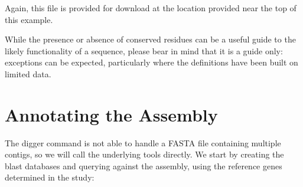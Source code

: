 \documentclass[letterpaper,10pt,english]{sphinxmanual}
\begin{document}
\begin{sphinxVerbatim}[commandchars=\\\{\}]
\end{sphinxVerbatim}

\sphinxAtStartPar
Again, this file is provided for download at the location provided near the top of this example.

\sphinxAtStartPar
While the presence or absence of conserved residues can be a useful guide to the likely functionality of a sequence, please bear in mind that it is a guide only:
exceptions can be expected, particularly where the definitions have been built on limited data.


\section{Annotating the Assembly}
\label{\detokenize{examples/rhesus_igh:annotating-the-assembly}}
\sphinxAtStartPar
The digger command is not able to handle a FASTA file containing multiple contigs, so we will call the underlying tools directly. We start by creating the blast databases and querying against the assembly,
using the reference genes determined in the study:
\end{document}
